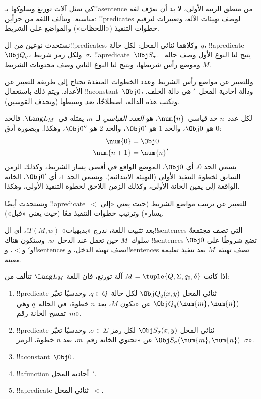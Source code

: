 \documentclass[../../../include/open-logic-section]{subfiles}
\begin{document}

\begin{explain}
كي نمثل آلات تورنغ وسلوكها بـ!!a{sentence} من منطق الرتبة الأولى، لا
بد أن نعرّف لغة مناسبة. وتتألف اللغة من جزأين: !!{predicate}s لوصف
تهيئات الآلة، وتعبيرات لترقيم خطوات التنفيذ («اللحظات») والمواضع على
الشريط.

نستحدث نوعين من ال!!{predicate}s، وكلاهما ثنائي المحل: لكل حالة~$q$،
!!a{predicate}~$\Obj Q_q$، ولكل رمز شريط~$\sigma$،
!!a{predicate}~$\Obj S_\sigma$. يتيح لنا النوع الأول وصف حالة~$M$
وموضع رأس شريطها، ويتيح لنا النوع الثاني وصف محتويات الشريط.

وللتعبير عن مواضع رأس الشريط وعدد الخطوات المنفذة نحتاج إلى طريقة
للتعبير عن الأعداد. ويتم ذلك باستعمال !!a{constant}~$\Obj 0$، ودالة
أحادية المحل~$\prime$ هي دالة الخلف. وتكتب هذه الدالة، اصطلاحًا،
\emph{بعد} وسيطها (ونحذف القوسين).

لكل عدد~$n$ حد قياسي~$\num{n}$، هو \emph{العدد القياسي} لـ~$n$، يمثله
في~$\Lang L_M$. فالحد $\num{0}$ هو $\Obj 0$، والحد $\num{1}$ هو
$\Obj 0'$، والحد $\num{2}$ هو $\Obj 0''$، وهكذا. وبصورة أدق:
\begin{align*}
\num{0} & = \Obj 0 \\
\num{n+1} &= \num{n}'
\end{align*}
يسمي الحد $\num{0}$، أي $\Obj 0$، الموضع الواقع في أقصى يسار الشريط،
وكذلك الزمن السابق لخطوة التنفيذ الأولى (التهيئة الابتدائية). ويسمي
الحد $\num{1}$، أي $\Obj 0'$، الخانة الواقعة إلى يمين الخانة الأولى،
وكذلك الزمن اللاحق لخطوة التنفيذ الأولى، وهكذا.

ونستحدث أيضًا !!a{predicate}~$<$ للتعبير عن ترتيب مواضع الشريط (حيث
يعني «إلى يسار») وترتيب خطوات التنفيذ معًا (حيث يعني «قبل»).

بعد تثبيت اللغة، ندرج «بديهيات» $!T(M,w)$، أي ال!!{sentence}s التي
تصف مجتمعةً سلوك~$M$ حين تعمل عند الدخل~$w$. وستكون هناك !!{sentence}s
تضع شروطًا على $\Obj 0$ و$\prime$ و$<$، و!!{sentence}s تصف تهيئة
الدخل، و!!{sentence}s تصف تهيئة~$M$ بعد تنفيذ تعليمة معينة.
\end{explain}

\begin{defn}
إذا كانت $M=\tuple{Q,\Sigma,q_0,\delta}$ آلة تورنغ، فإن اللغة
$\Lang L_M$ تتألف من:
\begin{enumerate}
\item !!{predicate} ثنائي المحل $\Obj Q_q(x,y)$ لكل حالة~$q\in Q$.
  وحدسيًا تعبّر $\Obj Q_q(\num{m},\num{n})$ عن «تكون $M$، بعد $n$
  خطوة، في الحالة~$q$ وهي تمسح الخانة رقم~$m$».
\item !!{predicate} ثنائي المحل $\Obj S_\sigma(x,y)$ لكل رمز
  $\sigma\in\Sigma$. وحدسيًا تعبّر
  $\Obj S_\sigma(\num{m},\num{n})$ عن «تحتوي الخانة رقم~$m$، بعد $n$
  خطوة، الرمز~$\sigma$».
\item !!a{constant}~$\Obj 0$.
\item !!a{function} أحادية المحل~$\prime$.
\item !!a{predicate} ثنائي المحل~$<$.
\end{enumerate}
\end{defn}
\end{document}
